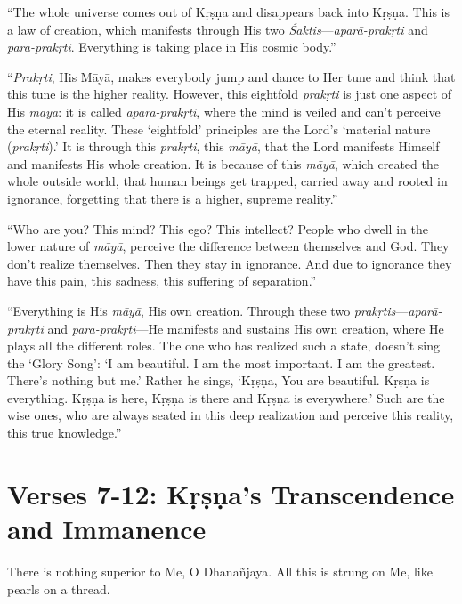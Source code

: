 \enquote{The whole universe comes out of Kṛṣṇa and disappears back into Kṛṣṇa. This is a law of creation, which manifests through His two \textit{Śaktis}---\textit{aparā-prakṛti} and \textit{parā-prakṛti}. Everything is taking place in His cosmic body.}

\enquote{\textit{Prakṛti}, His Māyā, makes everybody jump and dance to Her tune and think that this tune is the higher reality. However, this eightfold \textit{prakṛti} is just one aspect of His \textit{māyā}: it is called \textit{aparā-prakṛti}, where the mind is veiled and can’t perceive the eternal reality. These \enquote{eightfold} principles are the Lord’s \enquote{material nature (\textit{prakṛti}).} It is through this \textit{prakṛti}, this \textit{māyā}, that the Lord manifests Himself and manifests His whole creation. It is because of this \textit{māyā}, which created the whole outside world, that human beings get trapped, carried away and rooted in ignorance, forgetting that there is a higher, supreme reality.}

\enquote{Who are you? This mind? This ego? This intellect? People who dwell in the lower nature of \textit{māyā}, perceive the difference between themselves and God. They don’t realize themselves. Then they stay in ignorance. And due to ignorance they have this pain, this sadness, this suffering of separation.}

\enquote{Everything is His \textit{māyā}, His own creation. Through these two \textit{prakṛtis}---\textit{aparā-prakṛti} and \textit{parā-prakṛti}---He manifests and sustains His own creation, where He plays all the different roles. The one who has realized such a state, doesn’t sing the \enquote{Glory Song}: \enquote{I am beautiful. I am the most important. I am the greatest. There’s nothing but me.} Rather he sings, \enquote{Kṛṣṇa, You are beautiful. Kṛṣṇa is everything. Kṛṣṇa is here, Kṛṣṇa is there and Kṛṣṇa is everywhere.} Such are the wise ones, who are always seated in this deep realization and perceive this reality, this true knowledge.}

\newpage
\section{Verses 7-12: Kṛṣṇa's Transcendence and Immanence}\label{sec-verses-7-12-krsna-s-transcendence-and-immanence}

{There is nothing superior to Me, O Dhanañjaya. All this is strung on Me, like pearls on a thread.}

